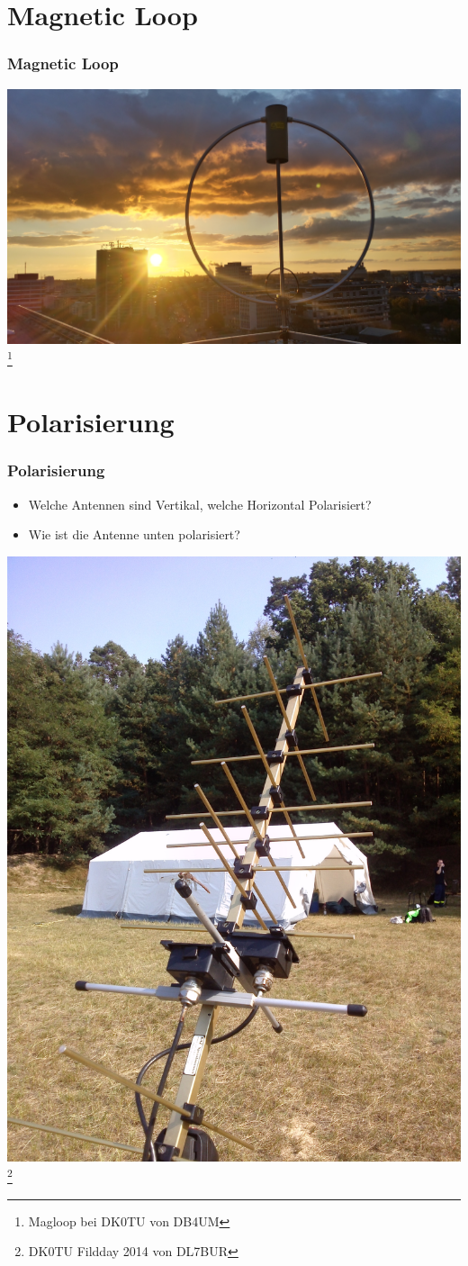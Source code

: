 \section*{Magnetic Loop}

\begin{frame}
    \frametitle{Magnetic Loop}
    \begin{center}
        \includegraphics[width=1\textwidth]{e11/Magloop.jpg}
        \footnote{\tiny Magloop bei DK0TU von DB4UM}
	\end{center}
\end{frame}

\section*{Polarisierung}

\begin{frame}
    \frametitle{Polarisierung}
    	\begin{itemize}
		\item Welche Antennen sind Vertikal, welche Horizontal Polarisiert?
		\item Wie ist die Antenne unten polarisiert?
    \end{itemize}
    \begin{center}
        \includegraphics[width=.4\textwidth]{e11/kreutzYagi.jpg}
        \footnote{\tiny DK0TU Fildday 2014 von DL7BUR}
	\end{center}
\end{frame}

